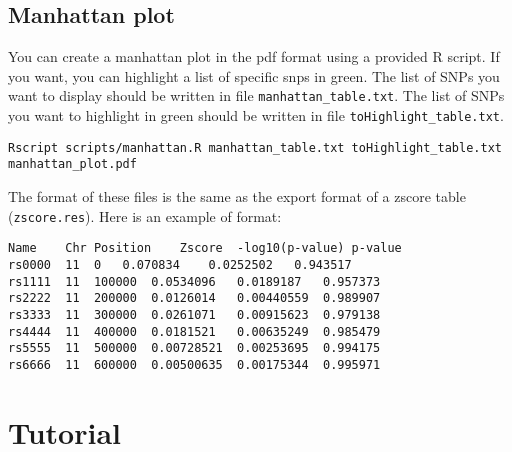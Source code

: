 \documentclass[10pt,a4paper]{article}
\begin{document}
\subsection{Manhattan plot}

You can create a manhattan plot in the pdf format using a provided R script. If you want, you can
highlight a list of specific snps in green. 
The list of SNPs you want to display should be written in file \verb|manhattan_table.txt|. The list of
SNPs you want to highlight in green should be written in file \verb|toHighlight_table.txt|.
\begin{Verbatim}[frame=single]
Rscript scripts/manhattan.R manhattan_table.txt toHighlight_table.txt manhattan_plot.pdf
\end{Verbatim}
The format of these files is the same as the export format of a zscore table (\verb|zscore.res|).
Here is an example of format:
\begin{center}
\footnotesize
\begin{Verbatim}[frame=single]
Name	Chr	Position	Zscore	-log10(p-value) p-value
rs0000	11	0	0.070834	0.0252502	0.943517
rs1111	11	100000	0.0534096	0.0189187	0.957373
rs2222	11	200000	0.0126014	0.00440559	0.989907
rs3333	11	300000	0.0261071	0.00915623	0.979138
rs4444	11	400000	0.0181521	0.00635249	0.985479
rs5555	11	500000	0.00728521	0.00253695	0.994175
rs6666	11	600000	0.00500635	0.00175344	0.995971
\end{Verbatim}
\end{center}

\section{Tutorial}
\end{document}
